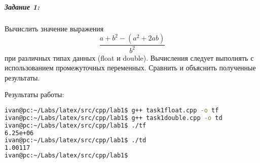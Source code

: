 \subparagraph{Задание 1:}
Вычислить значение выражения
\[\frac{{a+b}^2-(a^2+2ab)}{b^2}\]
при различных типах данных (float и double).
Вычисления следует выполнять с использованием промежуточных переменных.
Сравнить и объяснить полученные результаты.




Результаты работы:

\begin{lstlisting}[label={lst:bashresults}, language=bash]
ivan@pc:~/Labs/latex/src/cpp/lab1$ g++ task1float.cpp -o tf
ivan@pc:~/Labs/latex/src/cpp/lab1$ g++ task1double.cpp -o td
ivan@pc:~/Labs/latex/src/cpp/lab1$ ./tf
6.25e+06
ivan@pc:~/Labs/latex/src/cpp/lab1$ ./td
1.00117
ivan@pc:~/Labs/latex/src/cpp/lab1$
\end{lstlisting}